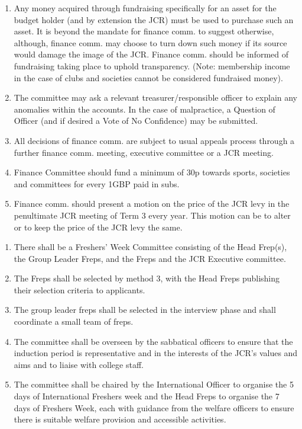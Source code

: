 \begin{enumerate}
    \item Any money acquired through fundraising specifically for an asset for the budget holder (and by extension the JCR) must be used to purchase such an asset. It is beyond the mandate for finance comm. to suggest otherwise, although, finance comm. may choose to turn down such money if its source would damage the image of the JCR. Finance comm. should be informed of fundraising taking place to uphold transparency. (Note: membership income in the case of clubs and societies cannot be considered fundraised money).
    \label{it:Fundraising}
    \item The committee may ask a relevant treasurer/responsible officer to explain any anomalies within the accounts. In the case of malpractice, a Question of Officer (and if desired a Vote of No Confidence) may be submitted.
    \item All decisions of finance comm. are subject to usual appeals process through a further finance comm. meeting, executive committee or a JCR meeting.
    \item Finance Committee should fund a minimum of 30p towards sports, societies and committees for every 1GBP paid in subs.
    \item Finance comm. should present a motion on the price of the JCR levy in the penultimate JCR meeting of Term 3 every year. This motion can be to alter or to keep the price of the JCR levy the same.
\end{enumerate}



\begin{enumerate}
    \item There shall be a Freshers’ Week Committee consisting of the Head Frep(s), the Group Leader Freps, and the Freps and the JCR Executive committee.
    \item The Freps shall be selected by method 3, with the Head Freps publishing their selection criteria to applicants.
    \item The group leader freps shall be selected in the interview phase and shall coordinate a small team of freps.
    \item The committee shall be overseen by the sabbatical officers to ensure that the induction period is representative and in the interests of the JCR’s values and aims and to liaise with college staff.
    \item The committee shall be chaired by the International Officer to organise the 5 days of International Freshers week and the Head Freps to organise the 7 days of Freshers Week, each with guidance from the welfare officers to ensure there is suitable welfare provision and accessible activities.
\end{enumerate}

